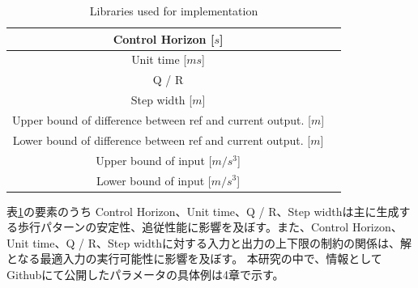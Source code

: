 \begin{table}[htbp]
  \centering
  \begin{tabular}{|c|c|} \hline
    Control Horizon  [$s$]                                           \\ \hline
    Unit time  [$ms$]                                                \\ \hline
    Q / R                                                            \\ \hline
    Step width  [$m$]                                                \\ \hline
    Upper bound of difference between ref and current output.  [$m$] \\ \hline
    Lower bound of difference between ref and current output.  [$m$] \\ \hline
    Upper bound of input  [$m/s^{3}$]                                \\ \hline
    Lower bound of input  [$m/s^{3}$]                                \\ \hline
  \end{tabular}
  \caption{Libraries used for implementation}
  \label{tb:parametor_list}
\end{table}

表\ref{tb:parametor_list}の要素のうち Control Horizon、Unit time、Q / R、Step widthは主に生成する歩行パターンの安定性、追従性能に影響を及ぼす。また、Control Horizon、Unit time、Q / R、Step widthに対する入力と出力の上下限の制約の関係は、解となる最適入力の実行可能性に影響を及ぼす。
本研究の中で、情報としてGithub\cite{MYGITHUB}にて公開したパラメータの具体例は4章で示す。